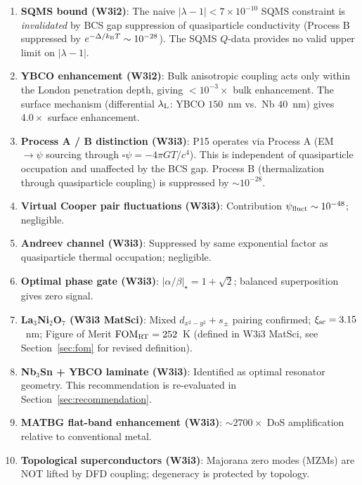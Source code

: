\documentclass[11pt]{article}
\newcommand{\ee}[1]{\times 10^{#1}}
\newcommand{\lam}{\lambda}
\newcommand{\lambdaL}{\lambda_{\rm L}}
\newcommand{\xsc}{\xi_{\rm sc}}
\newcommand{\kB}{k_{\rm B}}
\newcommand{\FOM}{\mathrm{FOM}}
\begin{document}
\begin{enumerate}
\item \textbf{SQMS bound (W3i2)}: The naive $|\lam-1| < 7\ee{-10}$ SQMS
  constraint is \emph{invalidated} by BCS gap suppression of quasiparticle
  conductivity (Process B suppressed by $e^{-\Delta/\kB T} \sim 10^{-28}$).
  The SQMS $Q$-data provides no valid upper limit on $|\lam-1|$.

\item \textbf{YBCO enhancement (W3i2)}: Bulk anisotropic coupling acts only
  within the London penetration depth, giving $< 10^{-3}\times$ bulk
  enhancement. The surface mechanism (differential $\lambdaL$: YBCO
  $150$~nm vs.\ Nb $40$~nm) gives $4.0\times$ surface enhancement.

\item \textbf{Process A / B distinction (W3i3)}: P15 operates via Process A
  (EM $\to \psi$ sourcing through $\square\psi = -4\pi G T/c^4$). This is
  independent of quasiparticle occupation and unaffected by the BCS gap.
  Process B (thermalization through quasiparticle coupling) is suppressed
  by $\sim 10^{-28}$.

\item \textbf{Virtual Cooper pair fluctuations (W3i3)}: Contribution
  $\psi_{\rm fluct} \sim 10^{-48}$; negligible.

\item \textbf{Andreev channel (W3i3)}: Suppressed by same exponential factor
  as quasiparticle thermal occupation; negligible.

\item \textbf{Optimal phase gate (W3i3)}: $|\alpha/\beta|_\star = 1 + \sqrt{2}$;
  balanced superposition gives zero signal.

\item \textbf{La$_3$Ni$_2$O$_7$ (W3i3 MatSci)}: Mixed $d_{x^2-y^2} + s_\pm$
  pairing confirmed; $\xsc = 3.15$~nm; Figure of Merit
  $\FOM_{\rm RT} = 252$~K (defined in W3i3 MatSci, see Section~\ref{sec:fom}
  for revised definition).

\item \textbf{Nb$_3$Sn + YBCO laminate (W3i3)}: Identified as optimal
  resonator geometry. This recommendation is re-evaluated in
  Section~\ref{sec:recommendation}.

\item \textbf{MATBG flat-band enhancement (W3i3)}: $\sim 2700\times$ DoS
  amplification relative to conventional metal.

\item \textbf{Topological superconductors (W3i3)}: Majorana zero modes (MZMs)
  are NOT lifted by DFD coupling; degeneracy is protected by topology.
\end{enumerate}
\end{document}
